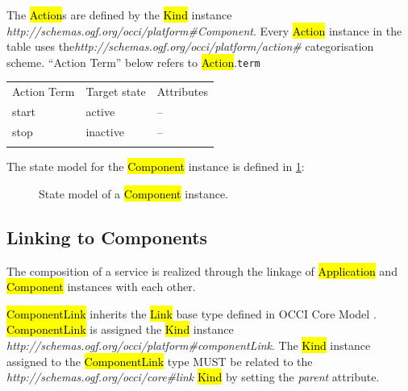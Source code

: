 \documentclass[10pt,a4paper]{article}
\begin{document}
The \hl{Action}s are defined by the \hl{Kind} instance \textit{http://schemas.ogf.org/occi/platform\#Component}. Every \hl{Action} instance in the table uses the\textit{http://schemas.ogf.org/occi/platform/action\#} categorisation scheme. ``Action Term'' below refers to \hl{Action}.{\tt term}

{
	\begin{tabular}{lll}
	\toprule
	Action Term & Target state & Attributes \\
	\colrule
	start & active & -- \\
	stop & inactive & -- \\
	\botrule
	\end{tabular}
}

The state model for the \hl{Component} instance is defined in \ref{fig:component_state}:

\begin{figure}[!h]
	{\centering {} \par}
	\caption{State model of a \hl{Component} instance.}
	\label{fig:component_state}
\end{figure}

\subsection{Linking to Components}

The composition of a service is realized through the linkage of \hl{Application} and \hl{Component} instances with each other.

\hl{ComponentLink} inherits the \hl{Link} base type defined in OCCI Core Model \cite{occi:core}. \hl{ComponentLink} is assigned the \hl{Kind} instance \textit{http://schemas.ogf.org/occi/platform\#componentLink}. The \hl{Kind} instance assigned to the \hl{ComponentLink} type MUST be related to the \textit{http://schemas.ogf.org/occi/core\#link} \hl{Kind} by setting the \textit{parent} attribute.
\end{document}
